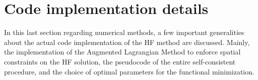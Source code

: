 \section{Code implementation details}
In this last section regarding numerical methods, a few important generalities about the actual code implementation of the HF method are discussed.
Mainly, the implementation of the Augmented Lagrangian Method to enforce spatial constraints on the HF solution, the pseudocode of the entire self-consistent procedure, and the choice of optimal parameters for the functional minimization.



